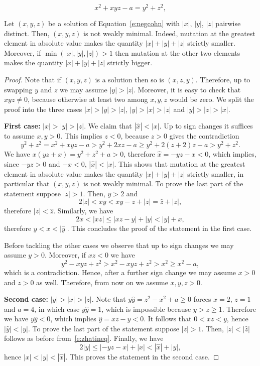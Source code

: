 \documentclass[10pt,a4paper]{amsart}
\begin{document}
\begin{equation}\label{e:negcohn}
x^2 + xyz -a = y^2 + z^2,
\end{equation}

\begin{prop}\label{p:negcohn}
	Let $(x,y,z)$ be a solution of Equation~\eqref{e:negcohn} with $|x|$, $|y|$, $|z|$ pairwise distinct.  
	Then, $(x,y,z)$ is not weakly minimal. Indeed, mutation at the greatest element in absolute value makes the quantity $|x|+|y|+|z|$ strictly smaller. Moreover, if $\min(|x|,|y|,|z|)>1$ then mutation at the other 
	two elements makes the quantity $|x|+|y|+|z|$ strictly bigger. 
\end{prop}

\begin{proof} 
Note that if $(x,y,z)$ is a solution then so is $(x,z,y)$. Therefore, 
up to swapping $y$ and $z$ we may assume $|y|>|z|$. Moreover, it is easy to check that $xyz\neq 0$, 
because otherwise at least two among $x,y,z$ would be zero. We split the proof into the three cases
$|x| > |y| > |z|$, $|y| > |x| > |z|$ and $|y| > |z| > |x|$.

\smallskip\noindent
{\bf First case:} $|x| > |y| > |z|$. We claim that $|\hat x|<|x|$. Up to sign changes it suffices to assume $x,y>0$. This implies $z<0$, because $z>0$ gives the contradiction
\[
y^2+z^2 = x^2+xyz-a > y^2 + 2xz-a \ge y^2+2(z+2)z-a> y^2+z^2.
\]
We have $x(yz+x)=y^2+z^2+a>0$, therefore $\hat x = -yz - x < 0$, which implies, since $-yz>0$ and $-x<0$, $|\hat x|<|x|$. 
This shows that mutation at the greatest element in absolute value makes the quantity $|x|+|y|+|z|$ strictly smaller, in particular that $(x,y,z)$ is not weakly minimal. 
To prove the last part of the statement suppose $|z|>1$. 
Then, $y>2$ and  
\begin{equation}\label{e:zhatineq}
2|z| < xy < xy-z + |z| = \hat z + |z|,
\end{equation}
therefore $|z| < \hat z$.
\color{black}
Similarly, we have 
\[
2 x < |xz| \leq |xz - y| + |y| < |\hat y| + x,
\]
therefore $y < x < |\hat y|$. This concludes the proof of the statement in the first case. 

Before tackling the other cases we observe that up to sign changes we may 
assume $y>0$. Moreover, if $xz<0$ we have  
\[
y^2 -xyz + z^2 > x^2 -xyz + z^2 > x^2 \ge x^2-a,
\]
which is a contradiction. Hence, after a further sign change we may assume 
$x>0$ and $z>0$ as well. Therefore, from now on we assume $x,y,z>0$. 

\smallskip\noindent
{\bf Second case:} $|y|>|x|>|z|$. 
Note that $y\hat y = z^2-x^2+a \geq 0$ forces $x=2$, $z=1$ and $a=4$, in which case   
$y\hat y = 1$, which is impossible because $y>z\geq 1$. Therefore we have 
$y\hat y<0$, which implies $\hat y = xz-y<0$. 
It follows that $0 < xz < y$, hence $|\hat y| < |y|$. 
To prove the last part of the statement suppose $|z|>1$. Then, 
$|z|<|\hat z|$ follows as before from~\eqref{e:zhatineq}. 
Finally, we have 
$$
2|y| \leq |-yz - x| + |x| < |\hat x| + |y|,
$$	
hence $|x|<|y|<|\hat x|$. This proves the statement in the second case. 


\end{proof}
\end{document}

